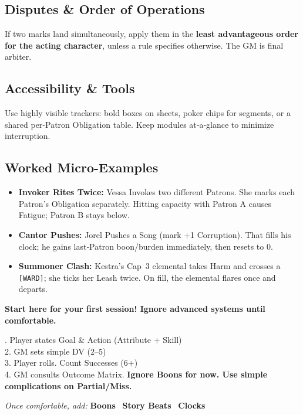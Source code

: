 \subsection{Disputes \& Order of Operations}
\label{subsec:module-disputes}
If two marks land simultaneously, apply them in the \textbf{least advantageous order for the acting character}, unless a rule specifies otherwise. The GM is final arbiter.

\subsection{Accessibility \& Tools}
\label{subsec:module-tools}
Use highly visible trackers: bold boxes on sheets, poker chips for segments, or a shared per‑Patron Obligation table. Keep modules at‑a‑glance to minimize interruption.

\subsection{Worked Micro-Examples}
\label{subsec:module-examples}
\begin{itemize}
  \item \textbf{Invoker Rites Twice:} Vessa Invokes two different Patrons. She marks each Patron’s Obligation separately. Hitting capacity with Patron A causes Fatigue; Patron B stays below.
  \item \textbf{Cantor Pushes:} Jorel Pushes a Song (mark +1 Corruption). That fills his clock; he gains last‑Patron boon/burden immediately, then resets to 0.
  \item \textbf{Summoner Clash:} Kestra’s Cap~3 elemental takes Harm and crosses a \texttt{[WARD]}; she ticks her Leash twice. On fill, the elemental flares once and departs.
\end{itemize}

\begin{tcolorbox}[title=\textbf{The Core Loop: Your First 10 Games},colback=blue!5,colframe=blue!75!black,fonttitle=\bfseries]
\textbf{Start here for your first session! Ignore advanced systems until comfortable.}

. Player states Goal \& Action (Attribute + Skill)\\
2. GM sets simple DV (2–5)\\
3. Player rolls. Count Successes (6+)\\
4. GM consults Outcome Matrix. \textbf{Ignore Boons for now. Use simple complications on Partial/Miss.}

\medskip
\footnotesize
\textit{Once comfortable, add:} \textbf{Boons} \textbar\ \textbf{Story Beats} \textbar\ \textbf{Clocks}
\end{tcolorbox}


